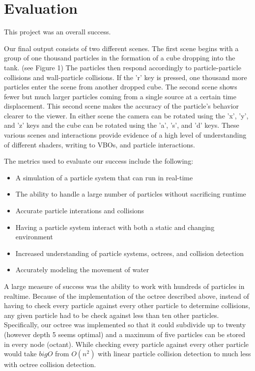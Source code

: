 \section{Evaluation}


This project was an overall success.

Our final output consists of two different scenes.  The first scene begins with a
group of one thousand particles in the formation of a cube dropping into the tank. 
(see Figure 1) 
The particles then respond accordingly to particle-particle collisions and wall-particle
collisions.  If the 'r' key is pressed, one thousand more particles enter the scene
from another dropped cube.  The second scene shows fewer but much larger particles 
coming from a single source at a certain time displacement.  This second scene makes
the accuracy of the particle's behavior clearer to the viewer.  In either scene the
camera can be rotated using the 'x', 'y', and 'z' keys and the cube can be rotated 
using the 'a', 's', and 'd' keys.  These various scenes and interactions provide 
evidence of a high level of understanding of different shaders, writing to VBOs,
and particle interactions.

The metrics used to evaluate our success include the following:
\begin{itemize}
  \item{A simulation of a particle system that can run in real-time}
  \item{The ability to handle a large number of particles without sacrificing runtime}
  \item{Accurate particle interations and collisions}
  \item{Having a particle system interact with both a static and changing environment}
  \item{Increased understanding of particle systems, octrees, and collision detection}
  \item{Accurately modeling the movement of water}
\end{itemize}

A large measure of success was the ability to work with hundreds of particles in realtime.
Because of the implementation of the octree described above, instead of having to check 
every particle against every other particle to determine collisions, any given particle 
had to be check against less than ten other particles.  Specifically, our octree was
implemented so that it could subdivide up to twenty (however depth 5 seems optimal) 
and a maximum of five particles
can be stored in every node (octant).  While checking every particle against every 
other particle would take $bigO$ from $O(n^2)$ with linear particle collision detection to
much less with octree collision detection.  

